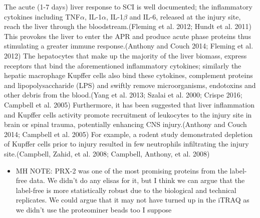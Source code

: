 \documentclass[9pt,lineno]{elife}
\providecommand{\tightlist}{%
  \setlength{\itemsep}{0pt}\setlength{\parskip}{0pt}}
\begin{document}
\begin{landscape}
\begin{landscape}
The acute (1-7 days) liver response to SCI is well documented; the inflammatory cytokines including TNF\(\alpha\), IL-1\(\alpha\), IL-1\(\beta\) and IL-6, released at the injury site, reach the liver through the bloodstream.(Fleming et al. 2012; Hundt et al. 2011)
This provokes the liver to enter the APR and produce acute phase proteins thus stimulating a greater immune response.(Anthony and Couch 2014; Fleming et al. 2012)
The hepatocytes that make up the majority of the liver biomass, express receptors that bind the aforementioned inflammatory cytokines; similarly the hepatic macrophage Kupffer cells also bind these cytokines, complement proteins and lipopolysaccharide (LPS) and swiftly remove microorganisms, endotoxins and other debris from the blood.(Yang et al. 2013; Szalai et al. 2000; Crispe 2016; Campbell et al. 2005)
Furthermore, it has been suggested that liver inflammation and Kupffer cells activity promote recruitment of leukocytes to the injury site in brain or spinal trauma, potentially enhancing CNS injury.(Anthony and Couch 2014; Campbell et al. 2005)
For example, a rodent study demonstrated depletion of Kupffer cells prior to injury resulted in few neutrophils infiltrating the injury site.(Campbell, Zahid, et al. 2008; Campbell, Anthony, et al. 2008)

\begin{itemize}
\tightlist
\item
  MH NOTE: PRX-2 was one of the most promising proteins from the label-free data. We didn't do any elisas for it, but I think we can argue that the label-free is more statistically robust due to the biological and technical replicates. We could argue that it may not have turned up in the iTRAQ as we didn't use the proteominer beads too I suppose
\end{itemize}


\end{landscape}
\end{landscape}
\end{document}
